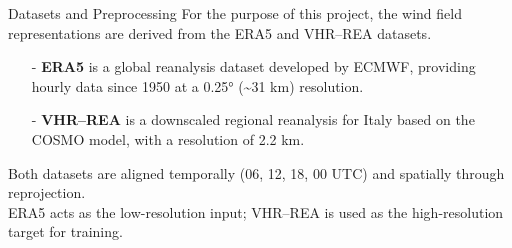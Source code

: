 \documentclass[footline=authortitle]{beamer}
\begin{document}

\begin{frame}{Datasets and Preprocessing}
    For the purpose of this project, the wind field representations are derived from the ERA5 and VHR--REA datasets.
    \vspace{1em}
        \begin{itemize}
        \justifying
            \item[-] \textbf{ERA5} is a global reanalysis dataset developed by ECMWF, providing hourly data since 1950 at a 0.25° (\textasciitilde31 km) resolution.
            \item[-] \textbf{VHR--REA} is a downscaled regional reanalysis for Italy based on the COSMO model, with a resolution of 2.2 km.
        \end{itemize}
    \vspace{1em}
    Both datasets are aligned temporally (06, 12, 18, 00 UTC) and spatially through reprojection. \\
    \vspace{1em}
    ERA5 acts as the low-resolution input; VHR--REA is used as the high-resolution target for training.
\end{frame}
\end{document}
